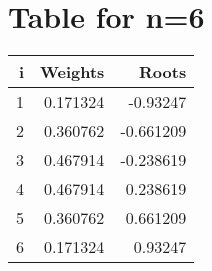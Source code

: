 \documentclass{article}
\begin{document}
\section*{Table for n=6}
\begin{tabular}{rrr}
\hline
   i &   Weights &     Roots \\
\hline
   1 &  0.171324 & -0.93247  \\
   2 &  0.360762 & -0.661209 \\
   3 &  0.467914 & -0.238619 \\
   4 &  0.467914 &  0.238619 \\
   5 &  0.360762 &  0.661209 \\
   6 &  0.171324 &  0.93247  \\
\hline
\end{tabular}
\end{document}
